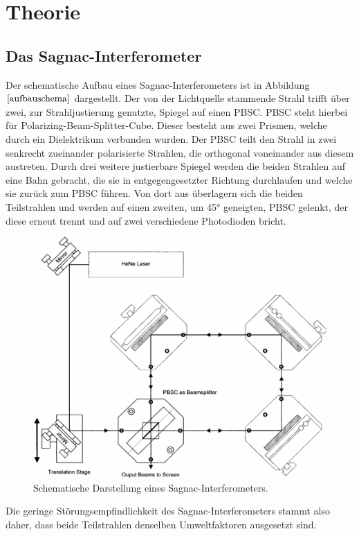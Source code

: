 \section{Theorie}
\subsection{Das Sagnac-Interferometer}
Der schematische Aufbau eines Sagnac-Interferometers ist in Abbildung $\ref{aufbauschema}$ dargestellt.
Der von der Lichtquelle stammende Strahl trifft über zwei, zur Strahljustierung genutzte,
Spiegel auf einen PBSC. PBSC steht hierbei für  Polarizing-Beam-Splitter-Cube. Dieser besteht aus zwei Prismen, welche durch ein
Dielektrikum verbunden wurden. Der PBSC teilt den Strahl in zwei senkrecht zueinander
polarisierte Strahlen, die orthogonal voneinander aus diesem austreten. Durch drei weitere justierbare Spiegel werden die beiden Strahlen auf eine Bahn gebracht, die sie in entgegengesetzter Richtung durchlaufen
und welche sie zurück zum PBSC führen. Von dort aus überlagern sich die beiden Teilstrahlen und werden auf einen zweiten, um 45° geneigten, PBSC gelenkt, der diese erneut trennt
und auf zwei verschiedene Photodioden bricht.
\begin{figure}[H]
  \centering
  \includegraphics[scale=0.35]{Bilder/schema.png}
  \caption{Schematische Darstellung eines Sagnac-Interferometers.\cite{anleitung}}
  \label{aufbauschema}
\end{figure}
\newpage
Die geringe Störungsempfindlichkeit des Sagnac-Interferometers stammt also daher, dass beide Teilstrahlen denselben Umweltfaktoren ausgesetzt sind.
